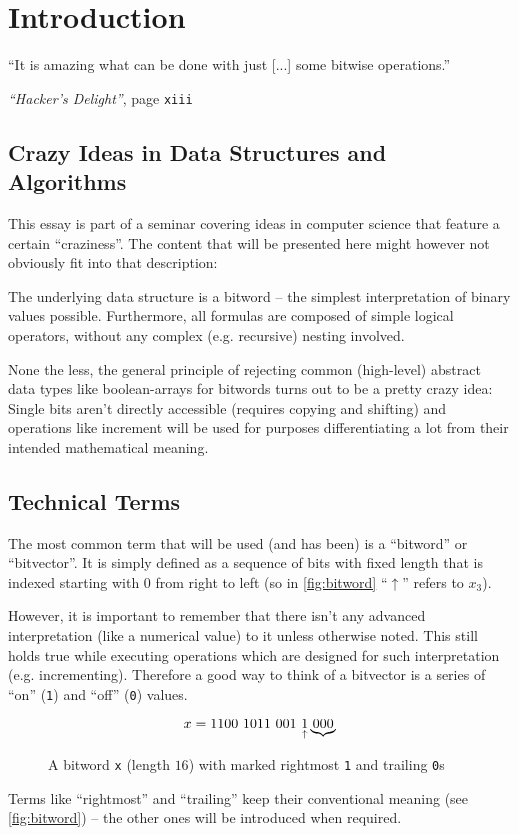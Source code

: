 \section{Introduction}\label{sec:introduction}
\epigraph{
``It is amazing what can be done
with just [...] some bitwise operations.''
}{
\emph{``Hacker's Delight''}, page \texttt{xiii}
\cite{Warren:2012:HD:2462741}
}


\subsection*{Crazy Ideas in Data Structures and Algorithms}
This essay is part of a seminar covering
ideas in computer science that feature a certain ``craziness''.
The content that will be presented here
might however not obviously fit into that description:

The underlying data structure is a bitword
-- the simplest interpretation of binary values possible.
Furthermore, all formulas are composed of simple logical operators,
without any complex (e.g. recursive) nesting involved.

None the less, the general principle of rejecting
common (high-level) abstract data types like boolean-arrays
for bitwords turns out to be a pretty crazy idea:
Single bits aren't directly accessible (requires copying and shifting)
and operations like increment will be used for
purposes differentiating a lot from their intended mathematical meaning.

\subsection*{Technical Terms}
The most common term that will be used (and has been)
is a ``bitword'' or ``bitvector''.
It is simply defined as a sequence of bits with fixed length
that is indexed starting with $0$ from right to left
(so in \autoref{fig:bitword} ``$\uparrow$'' refers to $x_3$).

However, it is important to remember that
there isn't any advanced interpretation (like a numerical value) to it
unless otherwise noted.
This still holds true while executing operations
which are designed for such interpretation (e.g. incrementing).
Therefore a good way to think of a bitvector
is a series of ``on'' (\lstinline$1$) and ``off'' (\lstinline$0$) values.

\begin{figure}[h]
\[
x = \lstinline$1100 1011 001 $
\underset{\uparrow}{\lstinline$1$}
\underbrace{\lstinline$000$}
\]
\caption{
A bitword \lstinline$x$ (length $16$)
with marked rightmost \lstinline$1$ and trailing \lstinline$0$s
}
\label{fig:bitword}
\end{figure}

Terms like ``rightmost'' and ``trailing''
keep their conventional meaning (see \autoref{fig:bitword})
-- the other ones will be introduced when required.
